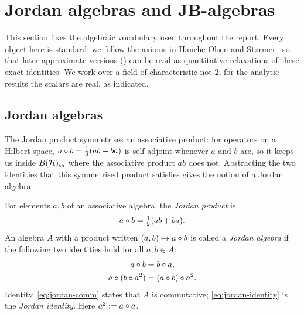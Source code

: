 \section{Jordan algebras and JB-algebras}\label{sec:jordan}

This section fixes the algebraic vocabulary used throughout the report. Every
object here is standard; we follow the axioms in Hanche-Olsen and
St{\o}rmer~\cite{HancheOlsenStormer1984} so that later approximate versions
() can be read as quantitative relaxations of these exact
identities. We work over a field of characteristic not $2$; for the analytic
results the scalars are real, as indicated.

\subsection{Jordan algebras}

The Jordan product symmetrises an associative product: for operators on a Hilbert
space, $a\circ b=\tfrac12(ab+ba)$ is self-adjoint whenever $a$ and $b$ are, so it
keeps us inside $B(\mathcal{H})_{\mathrm{sa}}$ where the associative product $ab$ does not. Abstracting
the two identities that this symmetrised product satisfies gives the notion of a
Jordan algebra.

\begin{definition}\label{def:jordan-algebra}
For elements $a,b$ of an associative algebra, the \emph{Jordan product} is
\begin{equation}\label{eq:jordan-product}
  a \circ b = \tfrac12(ab+ba).
\end{equation}
An algebra $A$ with a product written $(a,b)\mapsto a\circ b$ is called a
\emph{Jordan algebra} if the following two identities hold for all $a,b\in A$:
\begin{align}
  a \circ b &= b \circ a, \label{eq:jordan-comm}\\
  a \circ (b \circ a^2) &= (a \circ b) \circ a^2. \label{eq:jordan-identity}
\end{align}
Identity~\eqref{eq:jordan-comm} states that $A$ is commutative;
\eqref{eq:jordan-identity} is the \emph{Jordan identity}. Here $a^2 := a\circ a$.
\end{definition}


